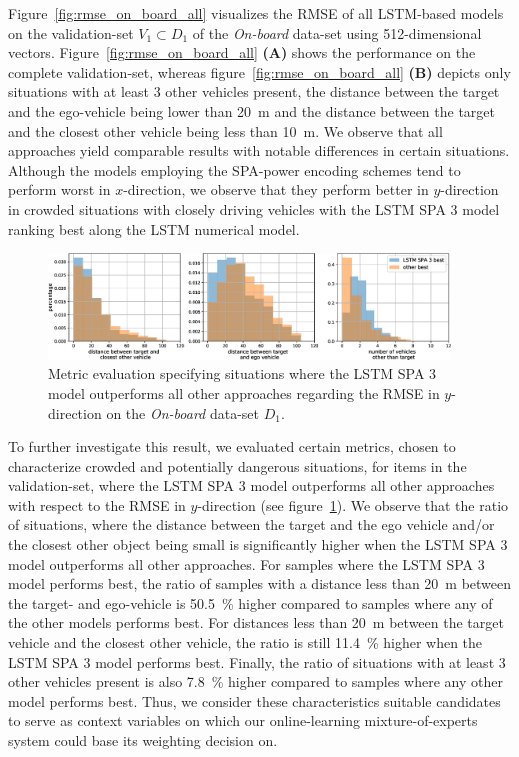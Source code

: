 Figure~\ref{fig:rmse_on_board_all} visualizes the \ac{RMSE} of all \ac{LSTM}-based models on the validation-set $V_1 \subset D_1$ of the \emph{On-board} data-set using \num{512}-dimensional vectors.
Figure~\ref{fig:rmse_on_board_all} \textbf{(A)} shows the performance on the complete validation-set, whereas figure~\ref{fig:rmse_on_board_all} \textbf{(B)} depicts only situations with at least \num{3} other vehicles present, the distance between the target and the ego-vehicle being lower than \SI{20}{\meter} and the distance between the target and the closest other vehicle being less than \SI{10}{\meter}.
We observe that all approaches yield comparable results with notable differences in certain situations.
Although the models employing the \ac{SPA}-power encoding schemes tend to perform worst in $x$-direction, we observe that they perform better in $y$-direction in crowded situations with closely driving vehicles with the \acs{LSTM} \acs{SPA} \num{3} model ranking best along the \acs{LSTM} numerical model.

\begin{figure}[t!]
  \centering
  \includegraphics[width=0.95\textwidth]{imgs/histogram_on_board_revised.eps}
  \caption{Metric evaluation specifying situations where the \ac{LSTM} \acs{SPA} \num{3} model outperforms all other approaches regarding the \acs{RMSE} in $y$-direction on the \emph{On-board} data-set $D_1$.}\label{fig:histograms_on_board}
\end{figure}

To further investigate this result, we evaluated certain metrics, chosen to characterize crowded and potentially dangerous situations, for items in the validation-set, where the \acs{LSTM} \acs{SPA} \num{3} model outperforms all other approaches with respect to the \ac{RMSE} in $y$-direction (see figure~\ref{fig:histograms_on_board}).
We observe that the ratio of situations, where the distance between the target and the ego vehicle and/or the closest other object being small is significantly higher when the \ac{LSTM} \ac{SPA} \num{3} model outperforms all other approaches.
For samples where the \ac{LSTM} \ac{SPA} \num{3} model performs best, the ratio of samples with a distance less than \SI{20}{\meter} between the target- and ego-vehicle is \SI{50.5}{\percent} higher compared to samples where any of the other models performs best.
For distances less than \SI{20}{\meter} between the target vehicle and the closest other vehicle, the ratio is still \SI{11.4}{\percent} higher when the \ac{LSTM} \ac{SPA} \num{3} model performs best.
Finally, the ratio of situations with at least \num{3} other vehicles present is also \SI{7.8}{\percent} higher compared to samples where any other model performs best.
Thus, we consider these characteristics suitable candidates to serve as context variables on which our online-learning mixture-of-experts system could base its weighting decision on.

